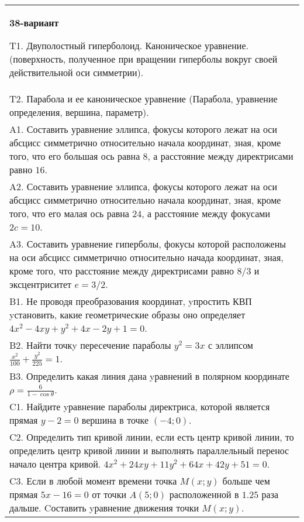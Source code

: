 \documentclass{article}
\begin{document}
\begin{tabular}{m{17cm}}
\textbf{38-вариант}
\newline

T1. Двуполостный гиперболоид. Каноническое уравнение. (поверхность, полученное при вращении гиперболы вокруг своей действительной оси симметрии).\\

T2. Парабола и ее каноническое уравнение (Парабола, уравнение определения, вершина, параметр).\\

A1. Составить уравнение эллипса, фокусы которого лежат на оси абсцисс симметрично относительно начала координат, зная, кроме того, что его большая ось равна $8$, а расстояние между директрисами равно $16$.\\

A2. Составить уравнение эллипса, фокусы которого лежат на оси абсцисс симметрично относительно начала координат, зная, кроме того, что его малая ось равна $24$, а расстояние между фокусами $2c=10$.\\

A3. Составить уравнение гиперболы, фокусы которой расположены на оси абсцисс симметрично относительно начада координат, зная, кроме того, что расстояние между директрисами равно $8/3$ и эксцентриситет $e=3/2$.\\

B1. Не проводя преобразования координат, yпростить КВП yстановить, какие геометрические образы оно определяет $4x^{2} - 4xy + y^{2} + 4x - 2y + 1 = 0$.  \\

B2. Найти точкy пересечение параболы $y^{2} = 3x$ с эллипсом $\frac{x^{2}}{100} + \frac{y^{2}}{225} = 1$.  \\

B3. Определить какая линия дана yравнений в полярном координате $\rho = \frac{6}{1 - \cos\theta}$.  \\

C1. Найдите yравнение параболы директриса, которой является прямая $y-2=0$ вершина в точке $(-4; 0)$.\\

C2. Определить тип кривой линии, если есть центр кривой линии, то определить центр кривой линии и выполнять параллельный перенос начало центра кривой. $4x^{2}+24xy+11y^{2}+64x+42y+51=0$.  \\

C3. Если в любой момент времени точка $M(x;y)$ больше чем прямая $5x-16=0$ от точки $A(5;0)$ расположенной в $1.25$ раза дальше. Cоставить yравнение движения точки $M(x;y)$.  \\

\end{tabular}
\vspace{1cm}
\end{document}
